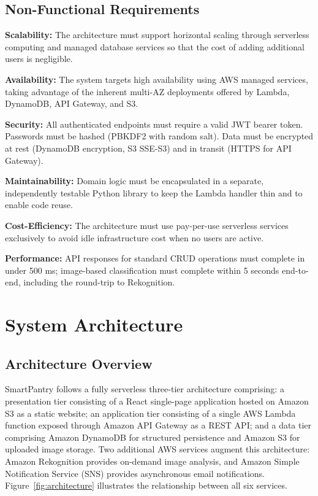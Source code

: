\documentclass[conference]{IEEEtran}
\begin{document}
\subsection{Non-Functional Requirements}

\textbf{Scalability:} The architecture must support horizontal scaling through serverless computing and managed database services so that the cost of adding additional users is negligible.

\textbf{Availability:} The system targets high availability using AWS managed services, taking advantage of the inherent multi-AZ deployments offered by Lambda, DynamoDB, API Gateway, and S3.

\textbf{Security:} All authenticated endpoints must require a valid JWT bearer token. Passwords must be hashed (PBKDF2 with random salt). Data must be encrypted at rest (DynamoDB encryption, S3 SSE-S3) and in transit (HTTPS for API Gateway).

\textbf{Maintainability:} Domain logic must be encapsulated in a separate, independently testable Python library to keep the Lambda handler thin and to enable code reuse.

\textbf{Cost-Efficiency:} The architecture must use pay-per-use serverless services exclusively to avoid idle infrastructure cost when no users are active.

\textbf{Performance:} API responses for standard CRUD operations must complete in under 500 ms; image-based classification must complete within 5 seconds end-to-end, including the round-trip to Rekognition.

\section{System Architecture}

\subsection{Architecture Overview}

SmartPantry follows a fully serverless three-tier architecture comprising: a presentation tier consisting of a React single-page application hosted on Amazon S3 as a static website; an application tier consisting of a single AWS Lambda function exposed through Amazon API Gateway as a REST API; and a data tier comprising Amazon DynamoDB for structured persistence and Amazon S3 for uploaded image storage. Two additional AWS services augment this architecture: Amazon Rekognition provides on-demand image analysis, and Amazon Simple Notification Service (SNS) provides asynchronous email notifications. Figure~\ref{fig:architecture} illustrates the relationship between all six services.
\end{document}

